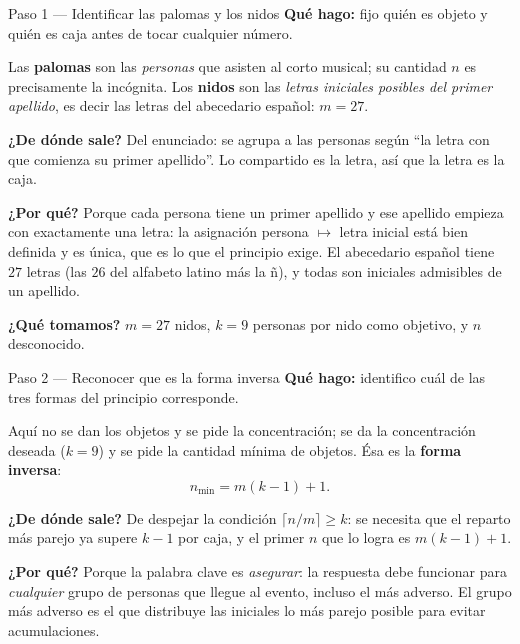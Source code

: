 \documentclass[11pt]{article}
\begin{document}
\begin{paso}{Paso 1 --- Identificar las palomas y los nidos}
\textbf{Qué hago:} fijo quién es objeto y quién es caja antes de tocar cualquier número.

Las \textbf{palomas} son las \emph{personas} que asisten al corto musical; su cantidad $n$ es precisamente la incógnita. Los \textbf{nidos} son las \emph{letras iniciales posibles del primer apellido}, es decir las letras del abecedario español: $m=27$.

\textbf{¿De dónde sale?} Del enunciado: se agrupa a las personas según ``la letra con que comienza su primer apellido''. Lo compartido es la letra, así que la letra es la caja.

\textbf{¿Por qué?} Porque cada persona tiene un primer apellido y ese apellido empieza con exactamente una letra: la asignación persona $\mapsto$ letra inicial está bien definida y es única, que es lo que el principio exige. El abecedario español tiene $27$ letras (las $26$ del alfabeto latino más la ñ), y todas son iniciales admisibles de un apellido.

\textbf{¿Qué tomamos?} $m=27$ nidos, $k=9$ personas por nido como objetivo, y $n$ desconocido.
\end{paso}

\begin{paso}{Paso 2 --- Reconocer que es la forma inversa}
\textbf{Qué hago:} identifico cuál de las tres formas del principio corresponde.

Aquí no se dan los objetos y se pide la concentración; se da la concentración deseada ($k=9$) y se pide la cantidad mínima de objetos. Ésa es la \textbf{forma inversa}:
\[
n_{\min}=m(k-1)+1 .
\]

\textbf{¿De dónde sale?} De despejar la condición $\lceil n/m\rceil\ge k$: se necesita que el reparto más parejo ya supere $k-1$ por caja, y el primer $n$ que lo logra es $m(k-1)+1$.

\textbf{¿Por qué?} Porque la palabra clave es \emph{asegurar}: la respuesta debe funcionar para \emph{cualquier} grupo de personas que llegue al evento, incluso el más adverso. El grupo más adverso es el que distribuye las iniciales lo más parejo posible para evitar acumulaciones.
\end{paso}
\end{document}
